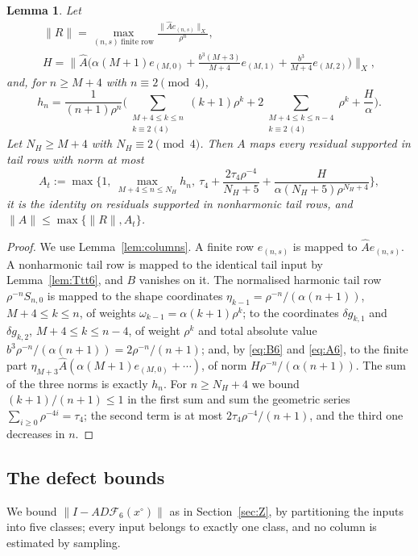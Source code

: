 \documentclass[11pt]{amsart}
\newtheorem{lemma}[theorem]{Lemma}
\theoremstyle{definition}
\theoremstyle{remark}
\numberwithin{equation}{section}
\newcommand{\Fc}{\mathcal{F}}
\newcommand{\nrm}[1]{\lVert #1\rVert}
\begin{document}
\begin{lemma}\label{lem:normA6}
Let
\begin{gather*}
\nrm R=\max_{(n,s)\ \text{finite row}}\frac{\nrm{\widehat Ae_{(n,s)}}_X}{\rho^n},\\
H=\Big\|\widehat A\Big(\alpha(M+1)e_{(M,0)}+\frac{b^3(M+3)}{M+4}e_{(M,1)}+\frac{b^3}{M+4}e_{(M,2)}\Big)\Big\|_X,
\end{gather*}
and, for $n\geq M+4$ with $n\equiv2\pmod4$,
\begin{equation}\label{eq:hn6}
h_n=\frac1{(n+1)\rho^n}\Big(\sum_{\substack{M+4\leq k\leq n\\k\equiv2\,(4)}}(k+1)\rho^k+2\sum_{\substack{M+4\leq k\leq n-4\\k\equiv2\,(4)}}\rho^k+\frac H\alpha\Big).
\end{equation}
Let $N_H\geq M+4$ with $N_H\equiv2\pmod4$. Then $A$ maps every residual supported in tail rows with norm at most
\[
A_t:=\max\Big\{1,\ \max_{M+4\leq n\leq N_H}h_n,\ \tau_4+\frac{2\tau_4\rho^{-4}}{N_H+5}+\frac{H}{\alpha(N_H+5)\rho^{N_H+4}}\Big\},
\]
it is the identity on residuals supported in nonharmonic tail rows, and $\nrm A\leq\max\{\nrm R,A_t\}$.
\end{lemma}

\begin{proof}
We use Lemma~\ref{lem:columns}. A finite row $e_{(n,s)}$ is mapped to $\widehat Ae_{(n,s)}$. A nonharmonic tail row is mapped to the identical tail input by Lemma~\ref{lem:Ttt6}, and $B$ vanishes on it. The normalised harmonic tail row $\rho^{-n}S_{n,0}$ is mapped to the shape coordinates $\eta_{k-1}=\rho^{-n}/(\alpha(n+1))$, $M+4\leq k\leq n$, of weights $\omega_{k-1}=\alpha(k+1)\rho^k$; to the coordinates $\delta g_{k,1}$ and $\delta g_{k,2}$, $M+4\leq k\leq n-4$, of weight $\rho^k$ and total absolute value $b^3\rho^{-n}/(\alpha(n+1))=2\rho^{-n}/(n+1)$; and, by \eqref{eq:B6} and \eqref{eq:A6}, to the finite part $\eta_{M+3}\widehat A(\alpha(M+1)e_{(M,0)}+\cdots)$, of norm $H\rho^{-n}/(\alpha(n+1))$. The sum of the three norms is exactly $h_n$. For $n\geq N_H+4$ we bound $(k+1)/(n+1)\leq1$ in the first sum and sum the geometric series $\sum_{i\geq0}\rho^{-4i}=\tau_4$; the second term is at most $2\tau_4\rho^{-4}/(n+1)$, and the third one decreases in $n$.
\end{proof}

\subsection{The defect bounds}
We bound $\nrm{I-AD\Fc_6(x^\circ)}$ as in Section~\ref{sec:Z}, by partitioning the inputs into five classes; every input belongs to exactly one class, and no column is estimated by sampling.
\end{document}

